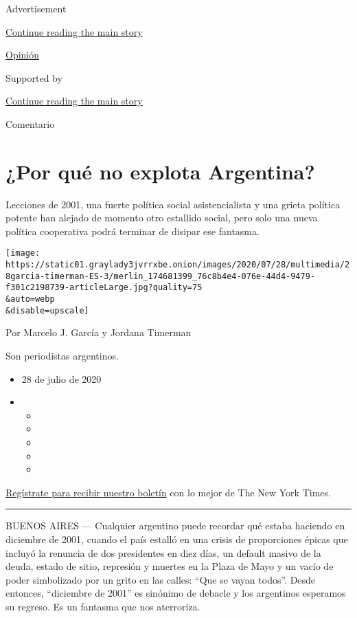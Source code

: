 Advertisement

\protect\hyperlink{after-top}{Continue reading the main story}

\href{/es/section/opinion}{Opinión}

Supported by

\protect\hyperlink{after-sponsor}{Continue reading the main story}

Comentario

\hypertarget{por-quuxe9-no-explota-argentina}{%
\section{¿Por qué no explota
Argentina?}\label{por-quuxe9-no-explota-argentina}}

Lecciones de 2001, una fuerte política social asistencialista y una
grieta política potente han alejado de momento otro estallido social,
pero solo una nueva política cooperativa podrá terminar de disipar ese
fantasma.

\texttt{[image: https://static01.graylady3jvrrxbe.onion/images/2020/07/28/multimedia/28garcia-timerman-ES-3/merlin\_174681399\_76c8b4e4-076e-44d4-9479-f301c2198739-articleLarge.jpg?quality=75\\\&auto=webp\\\&disable=upscale]}

Por Marcelo J. García y Jordana Timerman

Son periodistas argentinos.

\begin{itemize}
\item
  28 de julio de 2020
\item
  \begin{itemize}
  \item
  \item
  \item
  \item
  \item
  \end{itemize}
\end{itemize}

\href{https://www.nytimes3xbfgragh.onion/newsletters/el-times}{Regístrate
para recibir nuestro boletín} con lo mejor de The New York Times.

\begin{center}\rule{0.5\linewidth}{\linethickness}\end{center}

BUENOS AIRES --- Cualquier argentino puede recordar qué estaba haciendo
en diciembre de 2001, cuando el país estalló en una crisis de
proporciones épicas que incluyó la renuncia de dos presidentes en diez
días, un default masivo de la deuda, estado de sitio, represión y
muertes en la Plaza de Mayo y un vacío de poder simbolizado por un grito
en las calles: ``Que se vayan todos''. Desde entonces, ``diciembre de
2001'' es sinónimo de debacle y los argentinos esperamos su regreso. Es
un fantasma que nos aterroriza.

